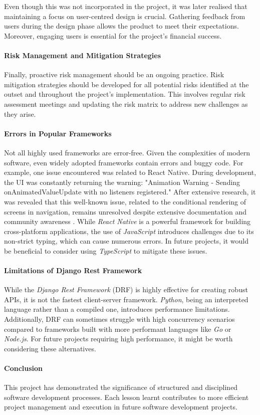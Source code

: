Even though this was not incorporated in the project, it was later realised that maintaining a focus on user-centred design is crucial. Gathering feedback from users during the design phase allows the product to meet their expectations. Moreover, engaging users is essential for the project's financial success.

\paragraph{Risk Management and Mitigation Strategies}

Finally, proactive risk management should be an ongoing practice. Risk mitigation strategies should be developed for all potential risks identified at the outset and throughout the project's implementation. This involves regular risk assessment meetings and updating the risk matrix to address new challenges as they arise. 

\paragraph{Errors in Popular Frameworks}

Not all highly used frameworks are error-free. Given the complexities of modern software, even widely adopted frameworks contain errors and buggy code. For example, one issue encountered was related to React Native. During development, the UI was constantly returning the warning: "Animation Warning - Sending onAnimatedValueUpdate with no listeners registered." After extensive research, it was revealed that this well-known issue, related to the conditional rendering of screens in navigation, remains unresolved despite extensive documentation and community awareness \cite{GithubAnimatedViewWarning, StackOverFlowAnimatedViewWarning}. While \textit{React Native} is a powerful framework for building cross-platform applications, the use of \textit{JavaScript} introduces challenges due to its non-strict typing, which can cause numerous errors. In future projects, it would be beneficial to consider using \textit{TypeScript} to mitigate these issues.

\paragraph{Limitations of Django Rest Framework}

While the \textit{Django Rest Framework} (DRF) is highly effective for creating robust APIs, it is not the fastest client-server framework. \textit{Python}, being an interpreted language rather than a compiled one, introduces performance limitations. Additionally, DRF can sometimes struggle with high concurrency scenarios compared to frameworks built with more performant languages like \textit{Go} or \textit{Node.js}. For future projects requiring high performance, it might be worth considering these alternatives.

\paragraph{Conclusion}

This project has demonstrated the significance of structured and disciplined software development processes. Each lesson learnt contributes to more efficient project management and execution in future software development projects.
